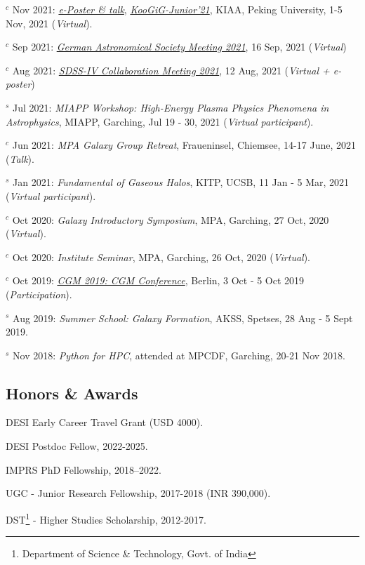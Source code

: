 \documentclass[12pt,letterpaper]{article}
\begin{document}
\begin{list}{}{\cvlist}
\item $^c$ Nov 2021:  \emph{\href{https://www.bilibili.com/video/BV1nv411M7w3}{e-Poster \& talk}}, \emph{\href{https://kiaa.pku.edu.cn/KooGig_junior21/Home.htm}{KooGiG-Junior'21}}, KIAA, Peking University, 1-5 Nov, 2021 (\textit{Virtual}).   

\item $^c$ Sep 2021:  \emph{\href{https://ag2021.astronomische-gesellschaft.de/view_splinter.php?session=Stars}{German Astronomical Society Meeting 2021}}, 16 Sep, 2021 (\textit{Virtual})   
\item $^c$ Aug 2021:  \emph{\href{https://jhu2021.sdss.org/}{SDSS-IV Collaboration Meeting 2021}}, 12 Aug, 2021 (\textit{Virtual + e-poster})   
\item $^s$ Jul 2021:  \emph{MIAPP Workshop: High-Energy Plasma Physics Phenomena in Astrophysics}, MIAPP, Garching, Jul 19 - 30, 2021 (\textit{Virtual participant}).  

\item $^c$ Jun 2021:  \emph{MPA Galaxy Group Retreat}, Fraueninsel, Chiemsee, 14-17 June, 2021 (\textit{Talk}).  
\item $^s$ Jan 2021:  \emph{Fundamental of Gaseous Halos}, KITP, UCSB, 11 Jan - 5 Mar, 2021 (\textit{Virtual participant}).  
\item $^c$ Oct 2020:  \emph{Galaxy Introductory Symposium}, MPA, Garching, 27 Oct, 2020 (\textit{Virtual}).  
\item $^c$ Oct 2020:  \emph{Institute Seminar}, MPA, Garching, 26 Oct, 2020 (\textit{Virtual}).  

\item $^c$ Oct 2019:  \emph{\href{https://wwwmpa.mpa-garching.mpg.de/conf/berlincgm2019/}{CGM 2019: CGM Conference}}, Berlin, 3 Oct - 5 Oct 2019 (\textit{Participation}).  
\item $^s$ Aug 2019:  \emph{Summer School: Galaxy Formation}, AKSS, Spetses, 28 Aug - 5 Sept 2019.  
\item $^s$ Nov 2018:  \emph{Python for HPC}, attended at MPCDF, Garching, 20-21 Nov 2018.  

\end{list}

\subsection{Honors \& Awards}
\begin{list}{}{\cvlist}
  \item DESI Early Career Travel Grant (USD 4000).
  \item DESI Postdoc Fellow, 2022-2025.
  \item IMPRS PhD Fellowship, 2018--2022.
  \item UGC - Junior Research Fellowship, 2017-2018 (INR 390,000).
  \item DST\footnote{Department of Science \& Technology, Govt. of India} - Higher Studies Scholarship, 2012-2017.

\end{list}
\end{document}

